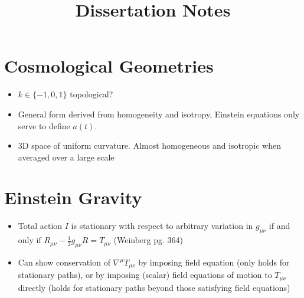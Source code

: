 \documentclass[10pt,letterpaper]{article}
\title{Dissertation Notes}
\date{}
\numberwithin{equation}{section}
\begin{document}
 
\maketitle
\noindent 

\section*{Cosmological Geometries}
\begin{itemize}
	\item $k\in \{-1,0,1\}$ topological?
	\item General form derived from homogeneity and isotropy, Einstein equations only serve to define  $a(t)$.
	\item 3D space of uniform curvature. Almost homogeneous and isotropic when averaged over a large scale
\end{itemize}
\section*{Einstein Gravity}
\begin{itemize}
	\item Total action $I$ is stationary with respect to arbitrary variation in $g_{\mu\nu}$ if and only if $R_{\mu\nu} - \frac{1}{2}g_{\mu\nu}R = T_{\mu\nu}$ (Weinberg pg. 364)
	\item Can show conservation of $\nabla^\mu T_{\mu\nu}$ by imposing field equation (only holds for stationary paths), or by imposing (scalar) field equations of motion to $T_{\mu\nu}$ directly (holds for stationary paths beyond those satisfying field equations)
\end{itemize}

\end{document}
